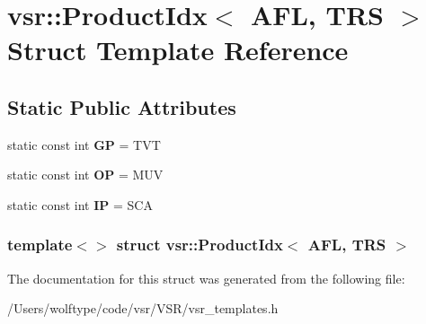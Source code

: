 \hypertarget{structvsr_1_1_product_idx_3_01_a_f_l_00_01_t_r_s_01_4}{\section{vsr\-:\-:Product\-Idx$<$ A\-F\-L, T\-R\-S $>$ Struct Template Reference}
\label{structvsr_1_1_product_idx_3_01_a_f_l_00_01_t_r_s_01_4}
}
\subsection*{Static Public Attributes}
\begin{DoxyCompactItemize}
\item 
\hypertarget{structvsr_1_1_product_idx_3_01_a_f_l_00_01_t_r_s_01_4_ae54591219d804efeb1ccd0aa386418e0}{static const int {\bfseries G\-P} = T\-V\-T}\label{structvsr_1_1_product_idx_3_01_a_f_l_00_01_t_r_s_01_4_ae54591219d804efeb1ccd0aa386418e0}

\item 
\hypertarget{structvsr_1_1_product_idx_3_01_a_f_l_00_01_t_r_s_01_4_ab3971af40513f2d9e8f4ea4da7535396}{static const int {\bfseries O\-P} = M\-U\-V}\label{structvsr_1_1_product_idx_3_01_a_f_l_00_01_t_r_s_01_4_ab3971af40513f2d9e8f4ea4da7535396}

\item 
\hypertarget{structvsr_1_1_product_idx_3_01_a_f_l_00_01_t_r_s_01_4_afb896711ad7ada2cf43bd9f14a14cb8c}{static const int {\bfseries I\-P} = S\-C\-A}\label{structvsr_1_1_product_idx_3_01_a_f_l_00_01_t_r_s_01_4_afb896711ad7ada2cf43bd9f14a14cb8c}

\end{DoxyCompactItemize}
\subsubsection*{template$<$$>$ struct vsr\-::\-Product\-Idx$<$ A\-F\-L, T\-R\-S $>$}



The documentation for this struct was generated from the following file\-:\begin{DoxyCompactItemize}
\item 
/\-Users/wolftype/code/vsr/\-V\-S\-R/vsr\-\_\-templates.\-h\end{DoxyCompactItemize}
